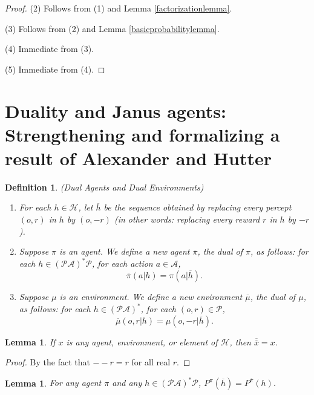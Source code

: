 \documentclass[twoside]{article}
\newtheorem{definition}[theorem]{Definition}
\newtheorem{lemma}[theorem]{Lemma}
\begin{document}
\begin{proof}
    (2) Follows from (1) and Lemma \ref{factorizationlemma}.

    (3) Follows from (2) and Lemma \ref{basicprobabilitylemma}.

    (4) Immediate from (3).

    (5) Immediate from (4).
\end{proof}

\section{Duality and Janus agents:
Strengthening and formalizing a result of Alexander and Hutter}

\begin{definition}
\label{dualagentsdefn}
(Dual Agents and Dual Environments)
\begin{enumerate}
    \item
    For each $h\in\mathcal H$, let $\overline h$ be the sequence obtained
    by replacing every percept $(o,r)$ in $h$ by $(o,-r)$ (in other words:
    replacing every reward $r$ in $h$ by $-r$).
    \item
    Suppose $\pi$ is an agent.
    We define a new agent $\overline \pi$, the \emph{dual} of $\pi$,
    as follows:
    for each $h\in (\mathcal P\mathcal A)^*\mathcal P$,
    for each action $a\in\mathcal A$,
    \[\overline\pi(a|h)=\pi(a|\overline h).\]
    \item
    Suppose $\mu$ is an environment.
    We define a new environment $\overline\mu$, the \emph{dual} of $\mu$,
    as follows:
    for each $h\in (\mathcal P\mathcal A)^*$,
    for each $(o,r)\in\mathcal P$,
    \[\overline\mu(o,r|h)=\mu(o,-r|\overline h).\]
\end{enumerate}
\end{definition}

\begin{lemma}
\label{doublenegationlemma}
    If $x$ is any agent, environment, or element of $\mathcal H$,
    then $\overline{\overline x}=x$.
\end{lemma}

\begin{proof}
    By the fact that $--r=r$ for all real $r$.
\end{proof}

\begin{lemma}
\label{asteriskcommuteswithoverlinelemma}
    For any agent $\pi$ and any $h\in(\mathcal P\mathcal A)^*\mathcal P$,
    $P^\pi(\overline h)=P^{\overline{\pi}}(h)$.
\end{lemma}
\end{document}
